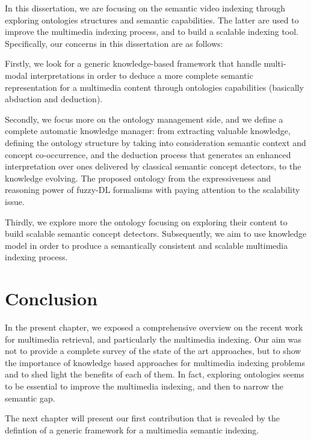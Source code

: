 		
		In this dissertation, we are focusing on the semantic video indexing through exploring ontologies
		structures and semantic capabilities. The latter are used to improve the multimedia indexing process,
		and to build a scalable indexing tool. Specifically, our concerns in this dissertation are as follows: 
		
		Firstly, we look for a generic knowledge-based framework that handle multi-modal interpretations
		in order to deduce a more complete semantic representation for a multimedia content through 
		ontologies capabilities (basically abduction and deduction). 

		Secondly, we focus more on the ontology management side, and we define a complete automatic 
		knowledge manager: from extracting valuable knowledge, defining the ontology structure by 
		taking into consideration semantic context and concept co-occurrence, and the deduction 
		process that generates an enhanced interpretation over ones delivered by classical
		semantic concept detectors, to the knowledge evolving. The proposed ontology   
		from the expressiveness and reasoning power of fuzzy-DL formalisms with paying 
		attention to the scalability issue.
	
		Thirdly, we explore more the ontology  focusing on exploring their content to build 
		scalable semantic concept detectors. Subsequently, we aim to use knowledge model in order 
		to produce a semantically consistent and scalable multimedia indexing process.


	\section{Conclusion}
		In the present chapter, we exposed a comprehensive overview on the recent work for 
		multimedia retrieval, and particularly the multimedia indexing. Our aim was not to provide 
		a complete survey of the state of the art approaches, but to show the importance of knowledge 
		based approaches for multimedia indexing problems and to shed light  the benefits of each of them. 
		In fact, exploring ontologies seems to be essential to improve the multimedia indexing, 
		and then to narrow the semantic gap. 

		The next chapter will present our first contribution that is revealed by the defintion
		of a generic framework for a multimedia semantic indexing.



